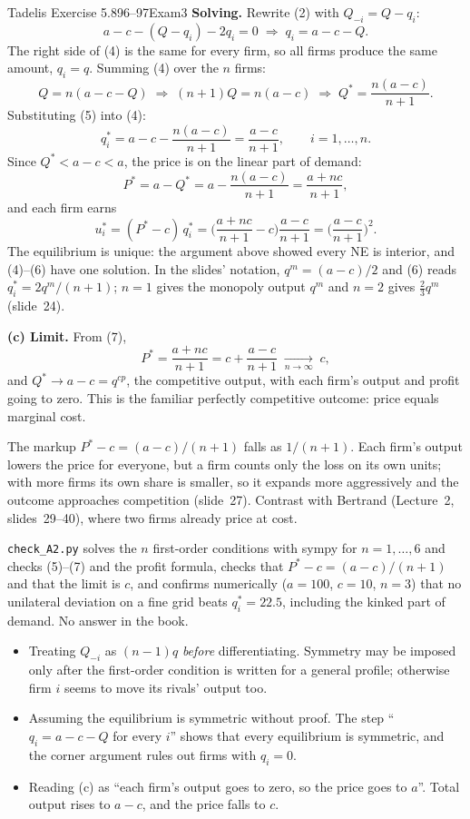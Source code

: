\begin{exsol}{Tadelis Exercise 5.8}{96--97}{Exam}{3}
\textbf{Solving.} Rewrite (2) with $Q_{-i} = Q - q_i$:
\[
  a - c - (Q - q_i) - 2q_i = 0 \;\Longrightarrow\; q_i = a - c - Q . \tag{4}
\]
The right side of (4) is the same for every firm, so all firms produce the same amount, $q_i = q$.
Summing (4) over the $n$ firms:
\[
  Q = n(a - c - Q) \;\Longrightarrow\; (n+1)Q = n(a - c) \;\Longrightarrow\;
  Q^* = \frac{n(a-c)}{n+1}. \tag{5}
\]
Substituting (5) into (4):
\[
  q_i^* = a - c - \frac{n(a-c)}{n+1} = \frac{a-c}{n+1}, \qquad i = 1, \dots, n. \tag{6}
\]
Since $Q^* < a - c < a$, the price is on the linear part of demand:
\[
  P^* = a - Q^* = a - \frac{n(a-c)}{n+1} = \frac{a + nc}{n+1}, \tag{7}
\]
and each firm earns
\[
  u_i^* = (P^* - c)\,q_i^* = \Big(\frac{a + nc}{n+1} - c\Big)\frac{a-c}{n+1}
        = \Big(\frac{a-c}{n+1}\Big)^2 .
\]
The equilibrium is unique: the argument above showed every NE is interior, and (4)--(6) have one
solution. In the slides' notation, $q^m = (a-c)/2$ and (6) reads $q_i^* = 2q^m/(n+1)$; $n = 1$
gives the monopoly output $q^m$ and $n = 2$ gives $\tfrac23 q^m$ (slide~24).

\textbf{(c) Limit.} From (7),
\[
  P^* = \frac{a + nc}{n+1} = c + \frac{a - c}{n+1} \;\xrightarrow[n\to\infty]{}\; c ,
\]
and $Q^* \to a - c = q^{cp}$, the competitive output, with each firm's output and profit going to
zero. This is the familiar perfectly competitive outcome: price equals marginal cost.

\interp The markup $P^* - c = (a-c)/(n+1)$ falls as $1/(n+1)$. Each firm's output lowers the
price for everyone, but a firm counts only the loss on its own units; with more firms its own share
is smaller, so it expands more aggressively and the outcome approaches competition (slide~27).
Contrast with Bertrand (Lecture~2, slides~29--40), where two firms already price at cost.

\verify \texttt{check\_A2.py} solves the $n$ first-order conditions with sympy for
$n = 1, \dots, 6$ and checks (5)--(7) and the profit formula, checks that $P^* - c = (a-c)/(n+1)$
and that the limit is $c$, and confirms numerically ($a = 100$, $c = 10$, $n = 3$) that no
unilateral deviation on a fine grid beats $q_i^* = 22.5$, including the kinked part of demand.
No answer in the book.

\mistakes
\begin{itemize}
  \item Treating $Q_{-i}$ as $(n-1)q$ \emph{before} differentiating. Symmetry may be imposed only after the first-order condition is written for a general profile; otherwise firm $i$ seems to move its rivals' output too.
  \item Assuming the equilibrium is symmetric without proof. The step ``$q_i = a - c - Q$ for every $i$'' shows that every equilibrium is symmetric, and the corner argument rules out firms with $q_i = 0$.
  \item Reading (c) as ``each firm's output goes to zero, so the price goes to $a$''. Total output rises to $a - c$, and the price falls to $c$.
\end{itemize}


\end{exsol}
